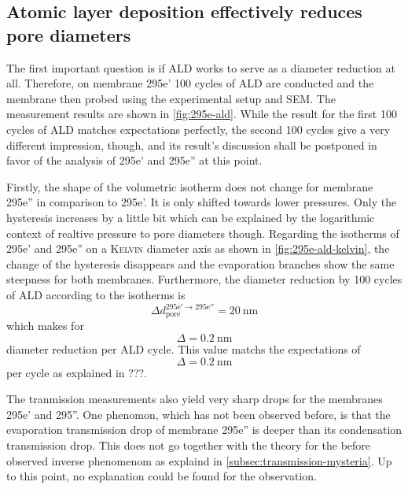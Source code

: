 \documentclass[../thesis.tex]{subfiles}
\begin{document}
        


        \subsection{Atomic layer deposition effectively reduces pore diameters}
        \label{subsec:ald-reduces-diameters}

          The first important question is if ALD works to serve as a diameter reduction at all. Therefore, on membrane 295e' 100 cycles of ALD are conducted and the membrane then probed using the experimental setup and SEM. The measurement results are shown in \cref{fig:295e-ald}. While the result for the first 100 cycles of ALD matches expectations perfectly, the second 100 cycles give a very different impression, though, and its result's discussion shall be postponed in favor of the analysis of 295e' and 295e'' at this point.

          Firstly, the shape of the volumetric isotherm does not change for membrane 295e'' in comparison to 295e'. It is only shifted towards lower pressures. Only the hysteresis increases by a little bit which can be explained by the logarithmic context of realtive pressure to pore diameters though. Regarding the isotherms of 295e' and 295e'' on a \textsc{Kelvin} diameter axis as shown in \cref{fig:295e-ald-kelvin}, the change of the hysteresis disappears and the evaporation branches show the same steepness for both membranes. Furthermore, the diameter reduction by 100 cycles of ALD according to the isotherms is
          \begin{equation}
            \Delta d_\mathrm{pore}^\mathrm{295e'\rightarrow 295e''}=\SI{20}{\nano\meter}
          \end{equation}
          which makes for
          \begin{equation}
            \Delta =\SI{0,2}{\nano\meter}
          \end{equation}
          diameter reduction per ALD cycle. This value matchs the expectations of
          \begin{equation}
            \Delta = \SI{0,2}{\nano\meter}
          \end{equation}
          per cycle as explained in ???.

          The tranmission measurements also yield very sharp drops for the membranes 295e' and 295''. One phenomon, which has not been observed before, is that the evaporation transmission drop of membrane 295e'' is deeper than its condensation transmission drop. This does not go together with the theory for the before observed inverse phenomenom as explaind in \cref{subsec:transmission-mysteria}. Up to this point, no explanation could be found for the observation.
\end{document}
